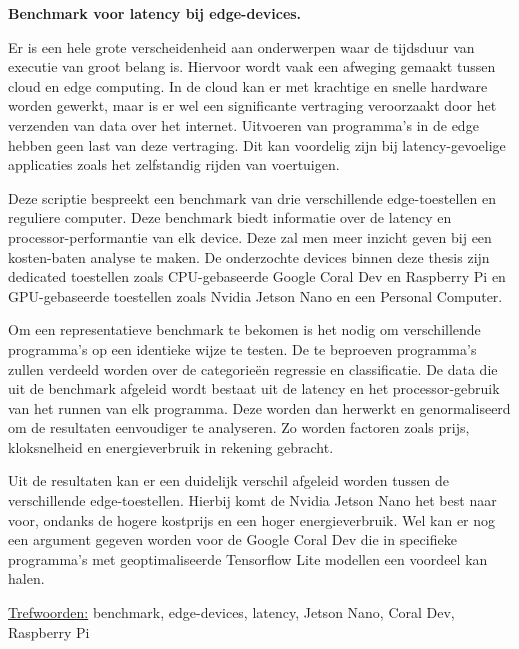 \textbf{Benchmark voor latency bij edge-devices.}

Er is een hele grote verscheidenheid aan onderwerpen waar de tijdsduur van executie van groot belang is. Hiervoor wordt vaak een afweging gemaakt tussen cloud en edge computing. In de cloud kan er met krachtige en snelle hardware worden gewerkt, maar is er wel een significante vertraging veroorzaakt door het verzenden van data over het internet. Uitvoeren van programma's in de edge hebben geen last van deze vertraging. Dit kan voordelig zijn bij latency-gevoelige applicaties zoals het zelfstandig rijden van voertuigen. 

Deze scriptie bespreekt een benchmark van drie verschillende edge-toestellen en reguliere computer. Deze benchmark biedt informatie over de latency en processor-performantie van elk device. Deze zal men meer inzicht geven bij een kosten-baten analyse te maken. De onderzochte devices binnen deze thesis zijn dedicated toestellen zoals CPU-gebaseerde Google Coral Dev en Raspberry Pi en GPU-gebaseerde toestellen zoals Nvidia Jetson Nano en een Personal Computer.

Om een representatieve benchmark te bekomen is het nodig om verschillende programma's op een identieke wijze te testen. De te beproeven programma's zullen verdeeld worden over de categorie\"en regressie en classificatie. De data die uit de benchmark afgeleid wordt bestaat uit de latency en het processor-gebruik van het runnen van elk programma. Deze worden dan herwerkt en genormaliseerd om de resultaten eenvoudiger te analyseren. Zo worden factoren zoals prijs, kloksnelheid en energieverbruik in rekening gebracht.

Uit de resultaten kan er een duidelijk verschil afgeleid worden tussen de verschillende edge-toestellen. Hierbij komt de Nvidia Jetson Nano het best naar voor, ondanks de hogere kostprijs en een hoger energieverbruik. Wel kan er nog een argument gegeven worden voor de Google Coral Dev die in specifieke programma's met geoptimaliseerde Tensorflow Lite modellen een voordeel kan halen.











\underline{Trefwoorden:} benchmark, edge-devices, latency, Jetson Nano, Coral Dev, Raspberry Pi